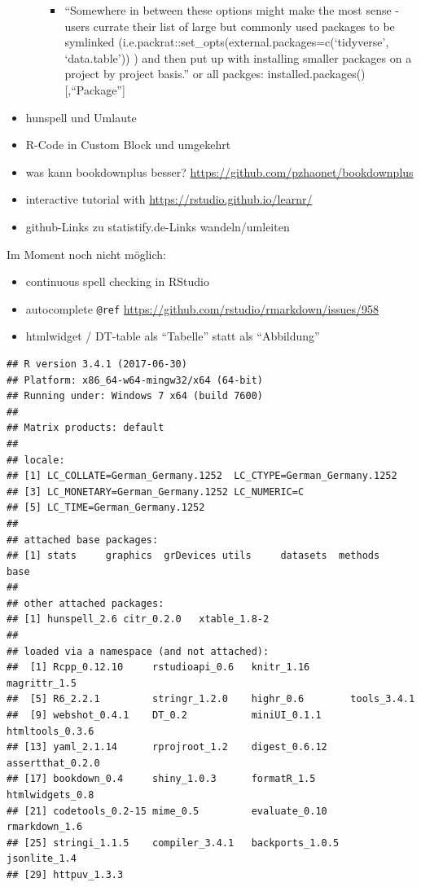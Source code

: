 \documentclass[]{book}
\providecommand{\tightlist}{%
  \setlength{\itemsep}{0pt}\setlength{\parskip}{0pt}}
\theoremstyle{definition}
\theoremstyle{definition}
\theoremstyle{remark}
\begin{document}
\begin{itemize}
\begin{itemize}
    \begin{itemize}
    \tightlist
    \item
      ``Somewhere in between these options might make the most sense -
      users currate their list of large but commonly used packages to be
      symlinked (i.e.packrat::set\_opts(external.packages=c(`tidyverse',
      `data.table')) ) and then put up with installing smaller packages
      on a project by project basis.'' or all packges:
      installed.packages(){[},``Package''{]}
    \end{itemize}
  \end{itemize}
\item
  hunspell und Umlaute
\item
  R-Code in Custom Block und umgekehrt
\item
  was kann bookdownplus besser?
  \url{https://github.com/pzhaonet/bookdownplus}
\item
  interactive tutorial with \url{https://rstudio.github.io/learnr/}
\item
  github-Links zu statistify.de-Links wandeln/umleiten
\end{itemize}

Im Moment noch nicht möglich:

\begin{itemize}
\tightlist
\item
  continuous spell checking in RStudio
\item
  autocomplete \texttt{@ref}
  \url{https://github.com/rstudio/rmarkdown/issues/958}
\item
  htmlwidget / DT-table als ``Tabelle'' statt als ``Abbildung''
\end{itemize}

\begin{verbatim}
## R version 3.4.1 (2017-06-30)
## Platform: x86_64-w64-mingw32/x64 (64-bit)
## Running under: Windows 7 x64 (build 7600)
## 
## Matrix products: default
## 
## locale:
## [1] LC_COLLATE=German_Germany.1252  LC_CTYPE=German_Germany.1252   
## [3] LC_MONETARY=German_Germany.1252 LC_NUMERIC=C                   
## [5] LC_TIME=German_Germany.1252    
## 
## attached base packages:
## [1] stats     graphics  grDevices utils     datasets  methods   base     
## 
## other attached packages:
## [1] hunspell_2.6 citr_0.2.0   xtable_1.8-2
## 
## loaded via a namespace (and not attached):
##  [1] Rcpp_0.12.10     rstudioapi_0.6   knitr_1.16       magrittr_1.5    
##  [5] R6_2.2.1         stringr_1.2.0    highr_0.6        tools_3.4.1     
##  [9] webshot_0.4.1    DT_0.2           miniUI_0.1.1     htmltools_0.3.6 
## [13] yaml_2.1.14      rprojroot_1.2    digest_0.6.12    assertthat_0.2.0
## [17] bookdown_0.4     shiny_1.0.3      formatR_1.5      htmlwidgets_0.8 
## [21] codetools_0.2-15 mime_0.5         evaluate_0.10    rmarkdown_1.6   
## [25] stringi_1.1.5    compiler_3.4.1   backports_1.0.5  jsonlite_1.4    
## [29] httpuv_1.3.3
\end{verbatim}


\end{document}
